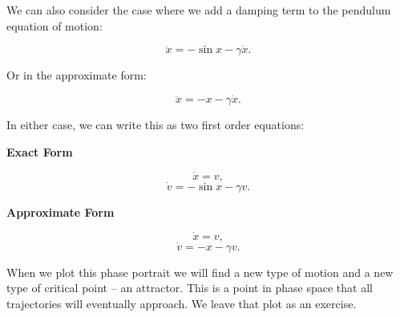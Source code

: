 \documentclass[11pt]{article}
\begin{document}
We can also consider the case where we add a damping term to the
pendulum equation of motion:

\[\ddot{x} = -\sin x - \gamma \dot{x}.\]

Or in the approximate form:

\[\ddot{x} = - x - \gamma \dot{x}.\]

In either case, we can write this as two first order equations:

\textbf{Exact Form}

\[\dot{x} = v,\] \[\dot{v} = -\sin x - \gamma v.\]

\textbf{Approximate Form}

\[\dot{x} = v,\] \[\dot{v} = -x - \gamma v.\]

When we plot this phase portrait we will find a new type of motion and a
new type of critical point -- an attractor. This is a point in phase
space that all trajectories will eventually approach. We leave that plot
as an exercise.

    


    
    
    
\end{document}
